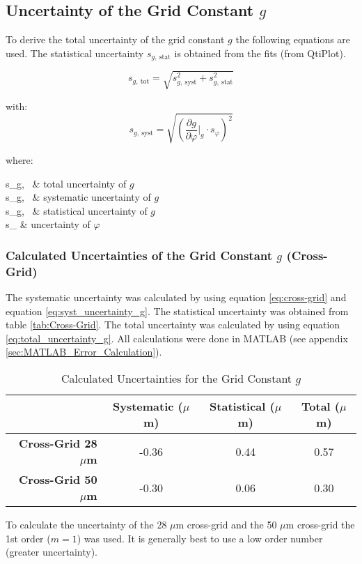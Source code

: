 \newpage

\subsection{Uncertainty of the Grid Constant $g$}
\label{subsec:Uncertainty_Grid_Constant}
To derive the total uncertainty of the grid constant $g$ the following equations are used. The statistical uncertainty $s_{g,\ \text{stat}}$ is obtained from the fits (from QtiPlot).

\begin{equation}
s_{g,\ \text{tot}}=\sqrt{s_{g,\ \text{syst}}^2+s_{g,\ \text{stat}}^2}
\label{eq:total_uncertainty_g}
\end{equation}

with:
\begin{equation}
s_{g,\ \text{syst}}=\sqrt{\left(\frac{\partial g}{\partial \varphi}\Biggr|_{g}\cdot s_{\varphi}\right)^2}
\label{eq:syst_uncertainty_g}
\end{equation}

where:
\begin{conditions}
	s_{g,\ } & total uncertainty of $g$ \\
	s_{g,\ } & systematic uncertainty of $g$ \\
	s_{g,\ } & statistical uncertainty of $g$ \\
	s_{\varphi} & uncertainty of $\varphi$
\end{conditions}

\subsubsection{Calculated Uncertainties of the Grid Constant $g$ (Cross-Grid)}
\label{subsubsec:Uncertainty_Grid_Constant_Cross-Grid}

The systematic uncertainty was calculated by using equation \ref{eq:cross-grid} and equation \ref{eq:syst_uncertainty_g}. The statistical uncertainty was obtained from table \ref{tab:Cross-Grid}. The total uncertainty was calculated by using equation \ref{eq:total_uncertainty_g}. All calculations were done in MATLAB (see appendix \ref{sec:MATLAB_Error_Calculation}).

\begin{table}[H]
	\centering
	\renewcommand{\arraystretch}{1.3}
	\begin{tabular}{r||c|c|c}
		 & \textbf{Systematic} ($\mu$m) & \textbf{Statistical} ($\mu$m) & \textbf{Total} ($\mu$m) \\
		\hline\hline
		\textbf{Cross-Grid 28 $\mu$m} & -0.36 & 0.44 & 0.57 \\
		\textbf{Cross-Grid 50 $\mu$m} & -0.30 & 0.06 & 0.30 \\
	\end{tabular}
	\caption{Calculated Uncertainties for the Grid Constant $g$}
	\label{tab:Calculated_Uncertainties_Grid_Constant}
\end{table}

To calculate the uncertainty of the 28 $\mu$m cross-grid and the 50 $\mu$m cross-grid the 1st order ($m = 1$) was used. It is generally best to use a low order number (greater uncertainty).
